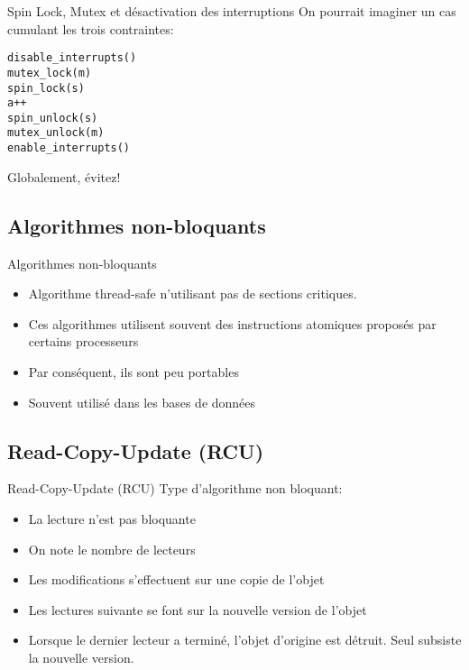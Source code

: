 \begin{frame}[fragile]{Spin Lock, Mutex et désactivation des interruptions}
  On pourrait imaginer un cas cumulant les trois contraintes:
  \begin{lstlisting}
disable_interrupts()
mutex_lock(m)
spin_lock(s)
a++
spin_unlock(s)
mutex_unlock(m)
enable_interrupts()
  \end{lstlisting}
  Globalement, évitez!
\end{frame}

\subsection{Algorithmes non-bloquants}

\begin{frame}{Algorithmes non-bloquants}
  \begin{itemize}
  \item Algorithme thread-safe n'utilisant pas de sections critiques.
  \item Ces  algorithmes utilisent souvent  des instructions atomiques
    proposés par certains processeurs
  \item Par conséquent, ils sont peu portables
  \item Souvent utilisé dans les bases de données
  \end{itemize}
\end{frame}

\subsection{Read-Copy-Update (RCU)}

\begin{frame}{Read-Copy-Update (RCU)}
  Type d'algorithme non bloquant:
  \begin{itemize}
  \item La lecture n'est pas bloquante
  \item On note le nombre de lecteurs
  \item Les modifications s'effectuent sur une copie de l'objet
  \item Les lectures suivante se font sur la nouvelle version de l'objet
  \item Lorsque  le dernier lecteur  a terminé, l'objet  d'origine est
    détruit. Seul subsiste la nouvelle version.
  \end{itemize}
\end{frame}

